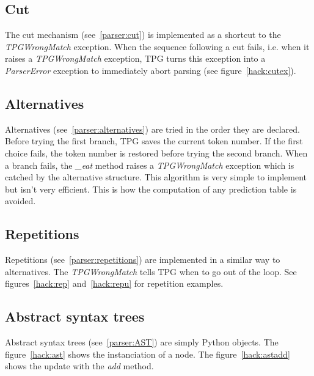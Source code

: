 \clearpage
\subsection{Cut}											\label{hack:cut}

The cut mechanism (see~\ref{parser:cut}) is implemented as a shortcut to the \emph{TPGWrongMatch} exception.
When the sequence following a cut fails, i.e. when it raises a \emph{TPGWrongMatch} exception,
TPG turns this exception into a \emph{ParserError} exception to immediately abort parsing (see figure~\ref{hack:cutex}).


\clearpage
\subsection{Alternatives}									\label{hack:alternatives}

Alternatives (see~\ref{parser:alternatives}) are tried in the order they are declared.
Before trying the first branch, TPG saves the current token number.
If the first choice fails, the token number is restored before trying the second branch.
When a branch fails, the \emph{\_eat} method raises a \emph{TPGWrongMatch} exception which is catched by the alternative structure.
This algorithm is very simple to implement but isn't very efficient.
This is how the computation of any prediction table is avoided.


\clearpage
\subsection{Repetitions}									\label{hack:repetitions}

Repetitions (see~\ref{parser:repetitions}) are implemented in a similar way to alternatives.
The \emph{TPGWrongMatch} tells TPG when to go out of the loop.
See figures~\ref{hack:rep} and~\ref{hack:repu} for repetition examples.


\clearpage
\subsection{Abstract syntax trees}

Abstract syntax trees (see~\ref{parser:AST}) are simply Python objects.
The figure~\ref{hack:ast} shows the instanciation of a node.
The figure~\ref{hack:astadd} shows the update with the \emph{add} method.

